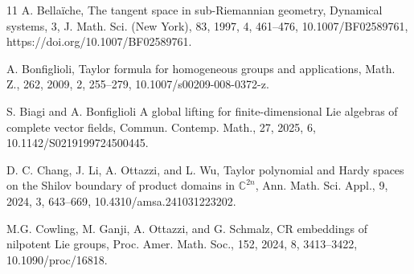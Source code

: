 \documentclass[12pt]{amsart}
\begin{document}
 



 
  
 


  
 



\begin{thebibliography}{11}
    {A. Bella\"iche},
    {The tangent space in sub-{R}iemannian geometry},
      {Dynamical systems, 3},
   {J. Math. Sci. (New York)},
  {83},
       {1997},
    {4},
  {461--476},
     {10.1007/BF02589761},
      {https://doi.org/10.1007/BF02589761}.

    {A. Bonfiglioli},
   {Taylor formula for homogeneous groups and applications},
  {Math. Z.},
 {262},
     {2009},
    {2},
   {255--279},
     {10.1007/s00209-008-0372-z}.
       


   S. Biagi and A. Bonfiglioli
   {A global lifting for finite-dimensional {L}ie algebras of
              complete vector fields},
    {Commun. Contemp. Math.},
    {27},
    {2025},
   {6},
     {10.1142/S0219199724500445}.
       



{D. C. Chang, J. Li, A. Ottazzi, and L. Wu},
     {Taylor polynomial and {H}ardy spaces on the {S}hilov boundary
              of product domains in {$\mathbb C^{2n}$}},
 {Ann. Math. Sci. Appl.},
  {9},
       {2024},
     {3},
     {643--669},
       {10.4310/amsa.241031223202}.

    {M.G. Cowling, M. Ganji, A. Ottazzi, and G. Schmalz},
     {C{R} embeddings of nilpotent {L}ie groups},
    {Proc. Amer. Math. Soc.},
   {152},
    {2024},
     {8},
     {3413--3422},
       {10.1090/proc/16818}.

 


\end{thebibliography}
\end{document}
